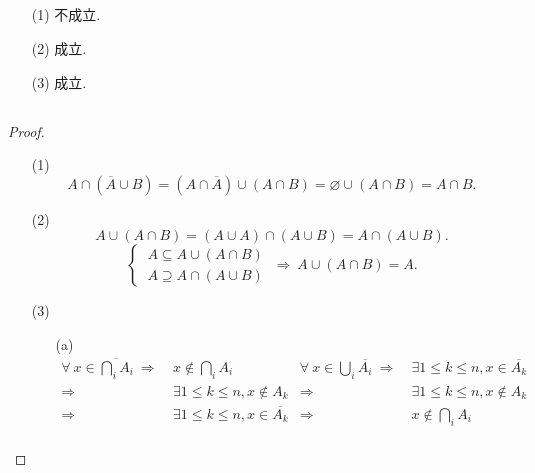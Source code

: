\documentclass[UTF8]{ctexart}
\begin{document}
\subsection{}   %
\begin{enumerate}
    \item [(1)]不成立.
    \item [(2)]成立.
    \item [(3)]成立.
\end{enumerate}

\subsection{}   %
\begin{proof}
    \begin{enumerate}
        \item []
        \item [(1)]
        \[
            A\cap \left( \overline{A} \cup B\right)
            =
            \left( A \cap \overline{A}\right) \cup \left( A \cap B \right)
            =
            \varnothing  \cup \left(A \cap B\right)
            = 
            A \cap B.
        \]
        \item [(2)]
        \[
            A\cup \left(A\cap B\right)
            =
            \left(A \cup A\right) \cap \left(A\cup B\right)
            =
            A\cap \left(A\cup B\right).
        \]
        \[
           \begin{cases}
            \ A\subseteq A\cup \left(A\cap B\right)\\
            \ A\supseteq A\cap \left(A\cup B\right)
           \end{cases}
           \ \Rightarrow\ 
           A\cup \left(A\cap B\right)
           = A.
        \]
        \item [(3)]
        \begin{enumerate}
            \item [(a)]
                \begin{align*}
                    \forall\ x \in \overline{\bigcap \limits_{i} A_i} \ \Rightarrow\ & x \notin  \bigcap \limits_{i} A_i & \forall\ x \in \bigcup\limits_{i}\overline{A_i} \ \Rightarrow\  & \exists 1 \leq k \leq n,x \in \overline{A_k}\\
                    \Rightarrow\ & \exists 1 \leq k \leq n,x \notin A_k & \Rightarrow\ & \exists 1 \leq k \leq n,x \notin A_k\\
                    \Rightarrow\ & \exists 1 \leq k \leq n,x \in \overline{A_k} & \Rightarrow\ & x \notin \bigcap \limits_{i}A_i\\

\end{align*}
\end{enumerate}
\end{enumerate}
\end{proof}
\end{document}
